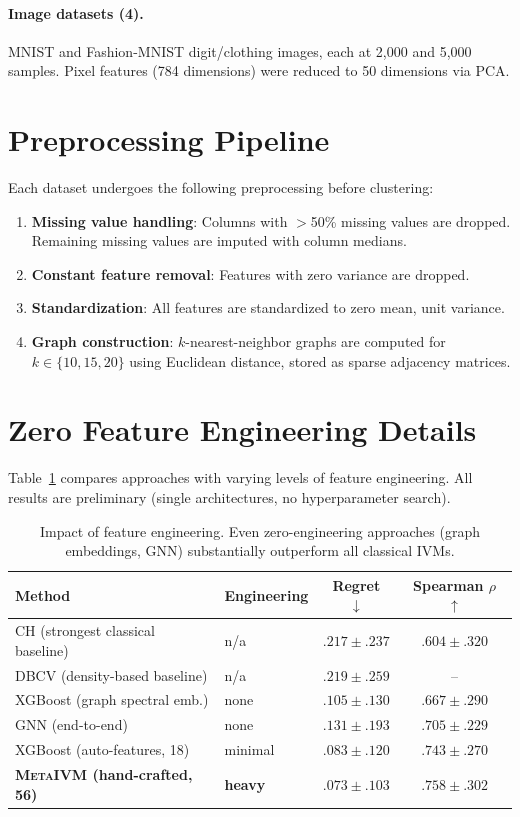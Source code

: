 \documentclass[10pt]{article} %
\newcommand{\ours}{\textsc{MetaIVM}}
\begin{document}
\paragraph{Image datasets (4).}
MNIST and Fashion-MNIST digit/clothing images, each at 2,000 and 5,000 samples. Pixel features (784 dimensions) were reduced to 50 dimensions via PCA.


\section{Preprocessing Pipeline}
\label{app:preprocessing}

Each dataset undergoes the following preprocessing before clustering:
\begin{enumerate}
    \item \textbf{Missing value handling}: Columns with $>$50\% missing values are dropped. Remaining missing values are imputed with column medians.
    \item \textbf{Constant feature removal}: Features with zero variance are dropped.
    \item \textbf{Standardization}: All features are standardized to zero mean, unit variance.
    \item \textbf{Graph construction}: $k$-nearest-neighbor graphs are computed for $k \in \{10, 15, 20\}$ using Euclidean distance, stored as sparse adjacency matrices.
\end{enumerate}


\section{Zero Feature Engineering Details}
\label{app:zero_engineering}

Table~\ref{tab:zero} compares approaches with varying levels of feature engineering. All results are preliminary (single architectures, no hyperparameter search).

\begin{table}[h]
\centering
\caption{Impact of feature engineering. Even zero-engineering approaches (graph embeddings, GNN) substantially outperform all classical IVMs.}
\label{tab:zero}
\small
\begin{tabular}{llcc}
\toprule
\textbf{Method} & \textbf{Engineering} & \textbf{Regret} $\downarrow$ & \textbf{Spearman} $\rho$ $\uparrow$ \\
\midrule
CH (strongest classical baseline) & n/a & $.217 \pm .237$ & $.604 \pm .320$ \\
DBCV (density-based baseline) & n/a & $.219 \pm .259$ & -- \\
\midrule
XGBoost (graph spectral emb.) & none & $.105 \pm .130$ & $.667 \pm .290$ \\
GNN (end-to-end) & none & $.131 \pm .193$ & $.705 \pm .229$ \\
XGBoost (auto-features, 18) & minimal & $.083 \pm .120$ & $.743 \pm .270$ \\
\textbf{\ours{} (hand-crafted, 56)} & \textbf{heavy} & $\mathbf{.073 \pm .103}$ & $\mathbf{.758 \pm .302}$ \\
\bottomrule
\end{tabular}
\end{table}
\end{document}
